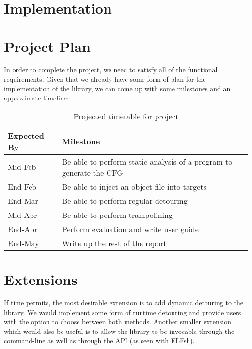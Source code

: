 \chapter{Implementation}



\chapter{Project Plan}

In order to complete the project, we need to satisfy all of the functional requirements. Given that we already have some form of plan for the implementation of the library, we can come up with some milestones and an approximate timeline:

\begin{table}[H]
 \caption{Projected timetable for project}
 \begin{tabular}{l p{12cm} }
 \hline
 Expected By & Milestone \\
 \hline
 Mid-Feb & Be able to perform static analysis of a program to generate the CFG \\
 End-Feb & Be able to inject an object file into targets \\
 End-Mar & Be able to perform regular detouring \\
 Mid-Apr & Be able to perform trampolining \\
 End-Apr & Perform evaluation and write user guide\\
 End-May & Write up the rest of the report \\
 \hline
 \end{tabular}
\end{table}

\chapter{Extensions}

If time permits, the most desirable extension is to add dynamic detouring to the library. We would implement some form of runtime detouring and provide users with the option to choose between both methods. Another smaller extension which would also be useful is to allow the library to be invocable through the command-line as well as through the API (as seen with ELFsh).

